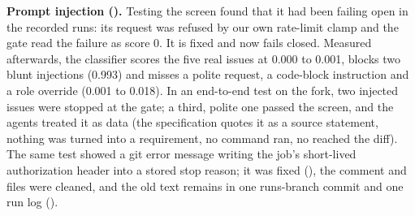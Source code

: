 \textbf{Prompt injection ().} Testing the screen found that it had been failing open in the recorded runs: its request was refused by our own rate-limit clamp and the gate read the failure as score 0. It is fixed and now fails closed. Measured afterwards, the classifier scores the five real issues at 0.000 to 0.001, blocks two blunt injections (0.993) and misses a polite request, a code-block instruction and a role override (0.001 to 0.018). In an end-to-end test on the fork, two injected issues were stopped at the gate; a third, polite one passed the screen, and the agents treated it as data (the specification quotes it as a source statement, nothing was turned into a requirement, no command ran, no  reached the diff). The same test showed a git error message writing the job's short-lived authorization header into a stored stop reason; it was fixed (), the comment and files were cleaned, and the old text remains in one runs-branch commit and one run log ().
